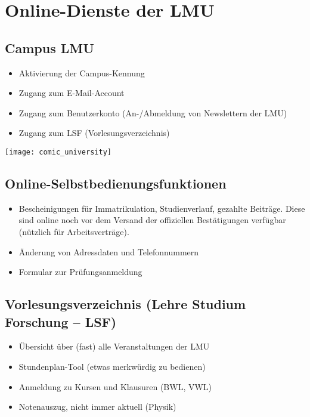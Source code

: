 \section{Online-Dienste der LMU}
\subsection*{Campus LMU}
\begin{itemize}
	\item Aktivierung der Campus-Kennung
	\item Zugang zum E-Mail-Account
	\item Zugang zum Benutzerkonto (An-/Abmeldung von Newslettern der LMU)
	\item Zugang zum LSF (Vorlesungsverzeichnis)
\end{itemize}
\begin{urlList}
\end{urlList}

\begin{center}
	{\texttt{[image: comic\_university]}}
\end{center}

\subsection*{Online-Selbstbedienungsfunktionen}
\begin{itemize}
	\item Bescheinigungen für Immatrikulation, Studienverlauf, gezahlte Beiträge. Diese sind online noch vor dem Versand der offiziellen Bestätigungen verfügbar (nützlich für Arbeitsverträge).
	\item Änderung von Adressdaten und Telefonnummern
	\item Formular zur Prüfungsanmeldung
\end{itemize}
\begin{urlList}
\end{urlList}

\subsection*{Vorlesungsverzeichnis (Lehre Studium Forschung -- LSF)}
\begin{itemize}
	\item Übersicht über (fast) alle Veranstaltungen der LMU
	\item Stundenplan-Tool (etwas merkwürdig zu bedienen)
	\item Anmeldung zu Kursen und Klausuren (BWL, VWL)
	\item Notenauszug, nicht immer aktuell (Physik)
\end{itemize}
\begin{urlList}
\end{urlList}


